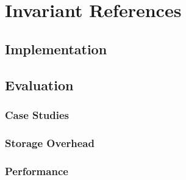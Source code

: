 
\chapter{Invariant References}\label{ch:invariant}

\section{Implementation}

\section{Evaluation}

\subsection{Case Studies}

\subsection{Storage Overhead}

\subsection{Performance}